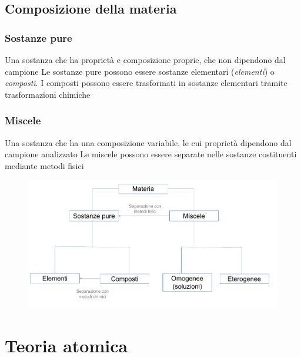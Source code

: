\documentclass[a4paper,11pt]{report}
\begin{document}
\section{Composizione della materia}
\subsection*{Sostanze pure}
Una sostanza che ha proprietà e composizione proprie, che non dipendono dal campione \newline
Le sostanze pure possono essere sostanze elementari (\emph{elementi}) o \emph{composti}. I composti possono essere trasformati in sostanze elementari tramite trasformazioni chimiche
\subsection*{Miscele}
Una sostanza che ha una composizione variabile, le cui proprietà dipendono dal campione analizzato \newline
Le miscele possono essere separate nelle sostanze costituenti mediante metodi fisici
\begin{figure}[H]
	\centering
	\includegraphics[width=\textwidth,height=\textheight,keepaspectratio]{immagini/grafico1}
	\label{fig:grafico1}
\end{figure}
\chapter{Teoria atomica}
\end{document}
